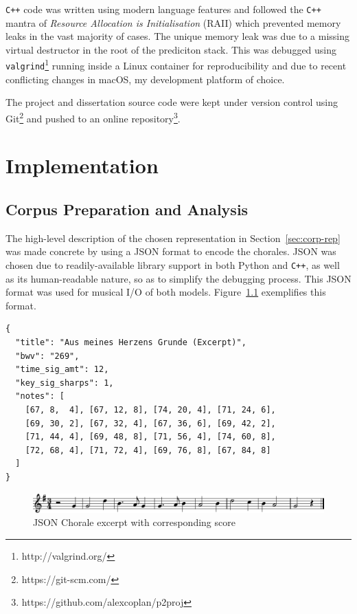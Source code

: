 \documentclass[12pt,a4paper,twoside,openright]{report}
\begin{document}
\texttt{C++} code was written using modern language features and followed the
\texttt{C++} mantra of \emph{Resource Allocation is Initialisation} (RAII) which
prevented memory leaks in the vast majority of cases. The unique memory leak was
due to a missing virtual destructor in the root of the prediciton stack. This
was debugged using \texttt{valgrind}\footnote{http://valgrind.org/} running
inside a Linux container for reproducibility and due to recent conflicting
changes in macOS, my development platform of choice.

The project and dissertation source code were kept under version control using
Git\footnote{https://git-scm.com/} and pushed to an online
repository\footnote{https://github.com/alexcoplan/p2proj}.

\chapter{Implementation}\label{chap:impl}

\section{Corpus Preparation and Analysis}\label{sec:corpus-prep-analysis}

The high-level description of the chosen representation in
Section~\ref{sec:corp-rep} was made concrete by using a JSON format to encode
the chorales. JSON was chosen due to readily-available library support in both
Python and \texttt{C++}, as well as its human-readable nature, so as to simplify
the debugging process. This JSON format was used for musical I/O of both models.
Figure~\ref{fig:chorale-excerpt} exemplifies this format. 

\vspace{4mm}
\begin{verbatim}
{
  "title": "Aus meines Herzens Grunde (Excerpt)",
  "bwv": "269",
  "time_sig_amt": 12,
  "key_sig_sharps": 1,
  "notes": [
    [67, 8,  4], [67, 12, 8], [74, 20, 4], [71, 24, 6], 
    [69, 30, 2], [67, 32, 4], [67, 36, 6], [69, 42, 2], 
    [71, 44, 4], [69, 48, 8], [71, 56, 4], [74, 60, 8], 
    [72, 68, 4], [71, 72, 4], [69, 76, 8], [67, 84, 8]
  ]
}
\end{verbatim}

\begin{figure}[H]
\centering
\includegraphics[width=450pt]{figs/aus_meines_excerpt.pdf}
\caption{JSON Chorale excerpt with corresponding score}
\label{fig:chorale-excerpt}
\end{figure}
\end{document}
